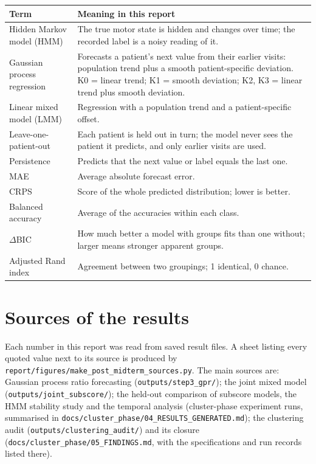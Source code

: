 \documentclass[11pt,a4paper]{article}
\begin{document}
\begin{table}[H]
  \centering
  \small
  \begin{tabularx}{\textwidth}{>{\raggedright\arraybackslash}p{3.8cm}Y}
    \toprule
    Term & Meaning in this report \\
    \midrule
    Hidden Markov model (HMM) & The true motor state is hidden and changes over
      time; the recorded label is a noisy reading of it. \\
    Gaussian process regression & Forecasts a patient's next value from their
      earlier visits: population trend plus a smooth patient-specific deviation.
      K0 = linear trend; K1 = smooth deviation; K2, K3 = linear trend plus smooth
      deviation. \\
    Linear mixed model (LMM) & Regression with a population trend and a
      patient-specific offset. \\
    Leave-one-patient-out & Each patient is held out in turn; the model never sees
      the patient it predicts, and only earlier visits are used. \\
    Persistence & Predicts that the next value or label equals the last one. \\
    MAE & Average absolute forecast error. \\
    CRPS & Score of the whole predicted distribution; lower is better. \\
    Balanced accuracy & Average of the accuracies within each class. \\
    $\Delta$BIC & How much better a model with groups fits than one without;
      larger means stronger apparent groups. \\
    Adjusted Rand index & Agreement between two groupings; 1 identical, 0 chance. \\
    \bottomrule
  \end{tabularx}
\end{table}

\section{Sources of the results}

Each number in this report was read from saved result files. A sheet listing
every quoted value next to its source is produced by
\nolinkurl{report/figures/make_post_midterm_sources.py}. The main sources are:
Gaussian process ratio forecasting (\nolinkurl{outputs/step3_gpr/}); the joint
mixed model (\nolinkurl{outputs/joint_subscore/}); the held-out comparison of
subscore models, the HMM stability study and the temporal analysis
(cluster-phase experiment runs, summarised in
\nolinkurl{docs/cluster_phase/04_RESULTS_GENERATED.md}); the clustering audit
(\nolinkurl{outputs/clustering_audit/}) and its closure
(\nolinkurl{docs/cluster_phase/05_FINDINGS.md}, with the specifications and run
records listed there).
\end{document}
